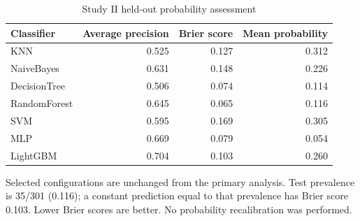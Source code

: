 \begin{table}[ht!]
\centering
\small
\caption[Study II held-out probability assessment]{Study II held-out probability assessment}
\label{tab:review_s2_probability_metrics}
\setlength{\tabcolsep}{4pt}
\begin{tabular}{lrrr}
\toprule
Classifier & Average precision & Brier score & Mean probability \\
\midrule
KNN & 0.525 & 0.127 & 0.312 \\
NaiveBayes & 0.631 & 0.148 & 0.226 \\
DecisionTree & 0.506 & 0.074 & 0.114 \\
RandomForest & 0.645 & 0.065 & 0.116 \\
SVM & 0.595 & 0.169 & 0.305 \\
MLP & 0.669 & 0.079 & 0.054 \\
LightGBM & 0.704 & 0.103 & 0.260 \\
\bottomrule
\end{tabular}
\par\smallskip
\begin{minipage}{0.98\linewidth}\footnotesize
Selected configurations are unchanged from the primary analysis. Test prevalence is 35/301 (0.116); a constant prediction equal to that prevalence has Brier score 0.103. Lower Brier scores are better. No probability recalibration was performed.
\end{minipage}
\end{table}
